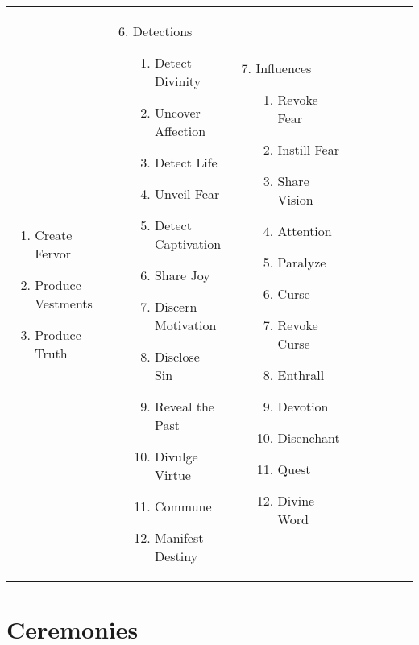 \begin{tabular}{@{} p{0.25\linewidth} p{0.25\linewidth} p{0.25\linewidth} p{0.25\linewidth}}
\begin{enumerate}
\begin{enumerate}
		\item Create Fervor
		\item Produce Vestments
		\item Produce Truth
	\end{enumerate}
\end{enumerate} &
\begin{enumerate}
	\setcounter{enumi}{5}
	\item Detections
	\begin{enumerate}
		\item Detect Divinity
		\item Uncover Affection
		\item Detect Life
		\item Unveil Fear
		\item Detect Captivation
		\item Share Joy
		\item Discern Motivation
		\item Disclose Sin
		\item Reveal the Past
		\item Divulge Virtue
		\item Commune
		\item Manifest Destiny
	\end{enumerate}
\end{enumerate} &
\begin{enumerate}
	\setcounter{enumi}{6}
	\item Influences
	\begin{enumerate}
		\item Revoke Fear
		\item Instill Fear
		\item Share Vision
		\item Attention
		\item Paralyze
		\item Curse
		\item Revoke Curse
		\item Enthrall
		\item Devotion
		\item Disenchant
		\item Quest
		\item Divine Word
	\end{enumerate}
\end{enumerate}
\end{tabular}
\pagebreak

\section{Ceremonies}

